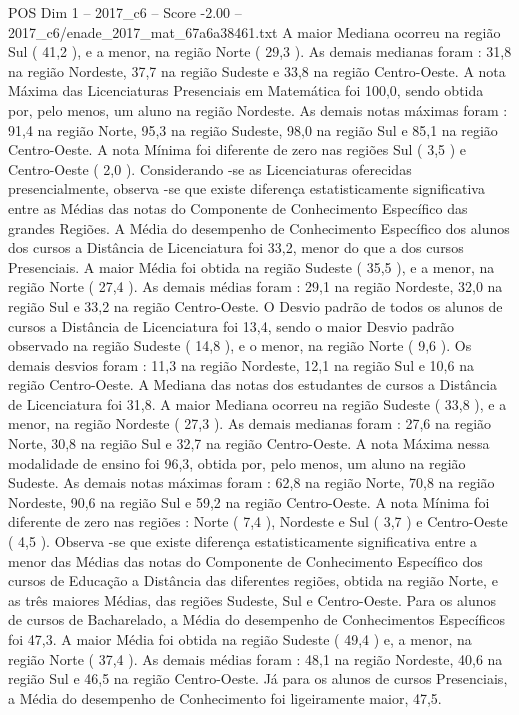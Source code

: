 \begin{textsample}{POS Dim 1 – 2017\_c6 – Score -2.00 – 2017\_c6/enade\_2017\_mat\_67a6a38461.txt}
A maior Mediana ocorreu na região Sul ( 41,2 ), e a menor, na região Norte ( 29,3 ).
As demais medianas foram : 31,8 na região Nordeste, 37,7 na região Sudeste e 33,8 na região Centro-Oeste.
A nota Máxima das Licenciaturas Presenciais em Matemática foi 100,0, sendo obtida por, pelo menos, um aluno na região Nordeste.
As demais notas máximas foram : 91,4 na região Norte, 95,3 na região Sudeste, 98,0 na região Sul e 85,1 na região Centro-Oeste.
A nota Mínima foi diferente de zero nas regiões Sul ( 3,5 ) e Centro-Oeste ( 2,0 ).
Considerando -se as Licenciaturas oferecidas presencialmente, observa -se que existe diferença estatisticamente significativa entre as Médias das notas do Componente de Conhecimento Específico das grandes Regiões.
A Média do desempenho de Conhecimento Específico dos alunos dos cursos a Distância de Licenciatura foi 33,2, menor do que a dos cursos Presenciais.
A maior Média foi obtida na região Sudeste ( 35,5 ), e a menor, na região Norte ( 27,4 ).
As demais médias foram : 29,1 na região Nordeste, 32,0 na região Sul e 33,2 na região Centro-Oeste.
O Desvio padrão de todos os alunos de cursos a Distância de Licenciatura foi 13,4, sendo o maior Desvio padrão observado na região Sudeste ( 14,8 ), e o menor, na região Norte ( 9,6 ).
Os demais desvios foram : 11,3 na região Nordeste, 12,1 na região Sul e 10,6 na região Centro-Oeste.
A Mediana das notas dos estudantes de cursos a Distância de Licenciatura foi 31,8.
A maior Mediana ocorreu na região Sudeste ( 33,8 ), e a menor, na região Nordeste ( 27,3 ).
As demais medianas foram : 27,6 na região Norte, 30,8 na região Sul e 32,7 na região Centro-Oeste.
A nota Máxima nessa modalidade de ensino foi 96,3, obtida por, pelo menos, um aluno na região Sudeste.
As demais notas máximas foram : 62,8 na região Norte, 70,8 na região Nordeste, 90,6 na região Sul e 59,2 na região Centro-Oeste.
A nota Mínima foi diferente de zero nas regiões : Norte ( 7,4 ), Nordeste e Sul ( 3,7 ) e Centro-Oeste ( 4,5 ).
Observa -se que existe diferença estatisticamente significativa entre a menor das Médias das notas do Componente de Conhecimento Específico dos cursos de Educação a Distância das diferentes regiões, obtida na região Norte, e as três maiores Médias, das regiões Sudeste, Sul e Centro-Oeste.
Para os alunos de cursos de Bacharelado, a Média do desempenho de Conhecimentos Específicos foi 47,3.
A maior Média foi obtida na região Sudeste ( 49,4 ) e, a menor, na região Norte ( 37,4 ).
As demais médias foram : 48,1 na região Nordeste, 40,6 na região Sul e 46,5 na região Centro-Oeste.
Já para os alunos de cursos Presenciais, a Média do desempenho de Conhecimento foi ligeiramente maior, 47,5.

\end{textsample}
